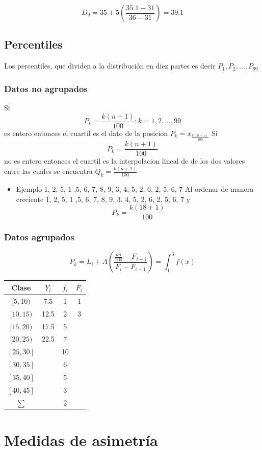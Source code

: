 \documentclass[10pt,]{krantz}
\providecommand{\tightlist}{%
  \setlength{\itemsep}{0pt}\setlength{\parskip}{0pt}}
\theoremstyle{definition}
\theoremstyle{definition}
\theoremstyle{definition}
\theoremstyle{definition}
\theoremstyle{remark}
\begin{document}
\[D_9=35+ 5\left(\frac{35.1-31}{36-31}\right)=39.1\]

\hypertarget{percentiles}{%
\section{Percentiles}\label{percentiles}}

Los percentiles, que dividen a la distribución en diez partes es decir \(P_1, P_2,\ldots, P_{99}\)

\hypertarget{datos-no-agrupados-2}{%
\subsection{Datos no agrupados}\label{datos-no-agrupados-2}}

Si \[P_k=\frac{k(n+1)}{100}; k=1, 2,  \ldots, 99\] es entero entonces el cuartil es el dato de la posicion \(P_k=x_\frac{k(n+1)}{100}\) Si \[P_k=\frac{k(n+1)}{100}\] no es entero entonces el cuartil es la interpolacion lineal de de los dos valores entre las cuales se encuentra \(Q_k=\frac{k(n+1)}{100}\)

\begin{itemize}
\tightlist
\item
  Ejemplo 1, 2, 5, 1 ,5, 6, 7, 8, 9, 3, 4, 5, 2, 6, 2, 5, 6, 7 Al ordenar de manera creciente 1, 2, 5, 1 ,5, 6, 7, 8, 9, 3, 4, 5, 2, 6, 2, 5, 6, 7 y \[P_k=\frac{k(18+1)}{100}\]
\end{itemize}

\hypertarget{datos-agrupados-2}{%
\subsection{Datos agrupados}\label{datos-agrupados-2}}

\[P_k=L_i+ A\left(\frac{\frac{kn}{100}-F_{i-1}}{F_i-F_{i-1}}\right)=\int_1^3f(x)\]

\begin{longtable}[]{@{}cccc@{}}
\toprule
Clase & \(Y_i\) & \(f_i\) & \(F_i\)\tabularnewline
\midrule
\endhead
\([5,10)\) & 7.5 & 1 & 1\tabularnewline
\([10,15)\) & 12.5 & 2 & 3\tabularnewline
\([15,20)\) & 17.5 & 5 &\tabularnewline
\([20,25)\) & 22.5 & 7 &\tabularnewline
\([25,30]\) & & 10 &\tabularnewline
\([30,35]\) & & 6 &\tabularnewline
\([35,40]\) & & 5 &\tabularnewline
\([40,45]\) & & 3 &\tabularnewline
\(\sum\) & & 2 &\tabularnewline
\bottomrule
\end{longtable}

\hypertarget{medidas-de-asimetruxeda}{%
\chapter{Medidas de asimetría}\label{medidas-de-asimetruxeda}}
\end{document}
